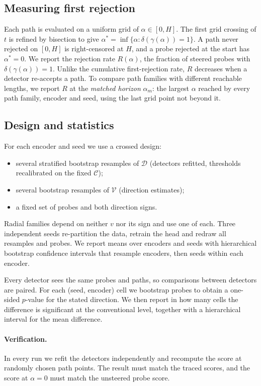 \documentclass[11pt]{article}
\theoremstyle{definition}
\theoremstyle{remark}
\begin{document}
\subsection{Measuring first rejection}
Each path is evaluated on a uniform grid of $\alpha\in[0,H]$. The first grid crossing of $t$ is refined by
bisection to give $\alpha^*=\inf\{\alpha:\delta(\gamma(\alpha))=1\}$. A path never rejected on $[0,H]$ is
right-censored at $H$, and a probe rejected at the start has $\alpha^*=0$. We report the rejection rate
$R(\alpha)$, the fraction of steered probes with $\delta(\gamma(\alpha))=1$. Unlike the cumulative
first-rejection rate, $R$ decreases when a detector re-accepts a path. To compare path families with
different reachable lengths, we report $R$ at the \emph{matched horizon} $\alpha_m$: the largest $\alpha$
reached by every path family, encoder and seed, using the last grid point not beyond it.

\subsection{Design and statistics}
For each encoder and seed we use a crossed design:
\begin{itemize}
\item several stratified bootstrap resamples of $\mathcal{D}$ (detectors refitted, thresholds recalibrated
on the fixed $\mathcal{C}$);
\item several bootstrap resamples of $\mathcal{V}$ (direction estimates);
\item a fixed set of probes and both direction signs.
\end{itemize}
Radial families depend on neither $v$ nor its sign and use one of each. Three independent seeds
re-partition the data, retrain the head and redraw all resamples and probes. We report means over encoders
and seeds with hierarchical bootstrap confidence intervals that resample encoders, then seeds within each
encoder.

Every detector sees the same probes and paths, so comparisons between detectors are paired. For each
(seed, encoder) cell we bootstrap probes to obtain a one-sided $p$-value for the stated direction. We then
report in how many cells the difference is significant at the conventional level, together with a
hierarchical interval for the mean difference.

\paragraph{Verification.} In every run we refit the detectors independently and recompute the score at
randomly chosen path points. The result must match the traced scores, and the score at $\alpha=0$ must
match the unsteered probe score.
\end{document}
